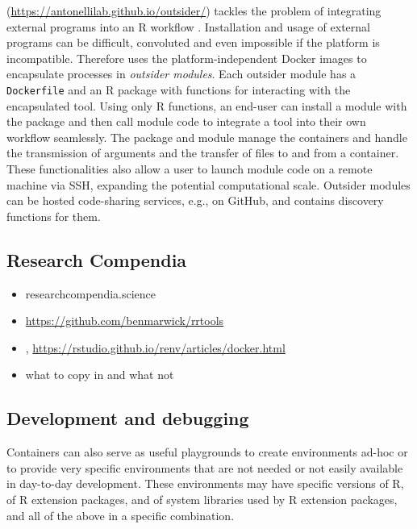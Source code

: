 \textbf{} (\url{https://antonellilab.github.io/outsider/})
tackles the problem of integrating external programs into an R workflow
\citep{bennett_outsider_2020}. Installation and usage of external
programs can be difficult, convoluted and even impossible if the
platform is incompatible. Therefore  uses the
platform-independent Docker images to encapsulate processes in
\emph{outsider modules}. Each outsider module has a \texttt{Dockerfile}
and an R package with functions for interacting with the encapsulated
tool. Using only R functions, an end-user can install a module with the
 package and then call module code to integrate a tool
into their own workflow seamlessly. The  package and
module manage the containers and handle the transmission of arguments
and the transfer of files to and from a container. These functionalities
also allow a user to launch module code on a remote machine via SSH,
expanding the potential computational scale. Outsider modules can be
hosted code-sharing services, e.g., on GitHub, and 
contains discovery functions for them.

\hypertarget{research-compendia}{%
\subsection{Research Compendia}\label{research-compendia}}

\label{compendia}

\begin{itemize}
\tightlist
\item
  researchcompendia.science
\item
  \url{https://github.com/benmarwick/rrtools}
\item
  , \url{https://rstudio.github.io/renv/articles/docker.html}
\item
  what to copy in and what not
\end{itemize}

\hypertarget{development-and-debugging}{%
\subsection{Development and debugging}\label{development-and-debugging}}

\label{development}

Containers can also serve as useful playgrounds to create environments
ad-hoc or to provide very specific environments that are not needed or
not easily available in day-to-day development. These environments may
have specific versions of R, of R extension packages, and of system
libraries used by R extension packages, and all of the above in a
specific combination.

